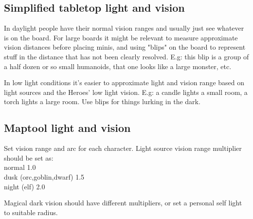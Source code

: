 \subsection*{Simplified tabletop light and vision}
In daylight people have their normal vision ranges and usually just see whatever is on the board. For large boards it might be relevant to measure approximate vision distances before placing minis, and using "blips" on the board to represent stuff in the distance that has not been clearly resolved. E.g: this blip is a group of a half dozen or so small humanoids, that one looks like a large monster, etc.

In low light conditions it's easier to approximate light and vision range based on light sources and the Heroes' low light vision. E.g: a candle lights a small room, a torch lights a large room. Use blips for things lurking in the dark.


\subsection*{Maptool light and vision}
Set vision range and arc for each character.
Light source vision range multiplier should be set as:\\
normal 1.0\\
dusk (orc,goblin,dwarf) 1.5\\
night (elf) 2.0


Magical dark vision should have different multipliers, or set a personal self light to suitable radius.






















